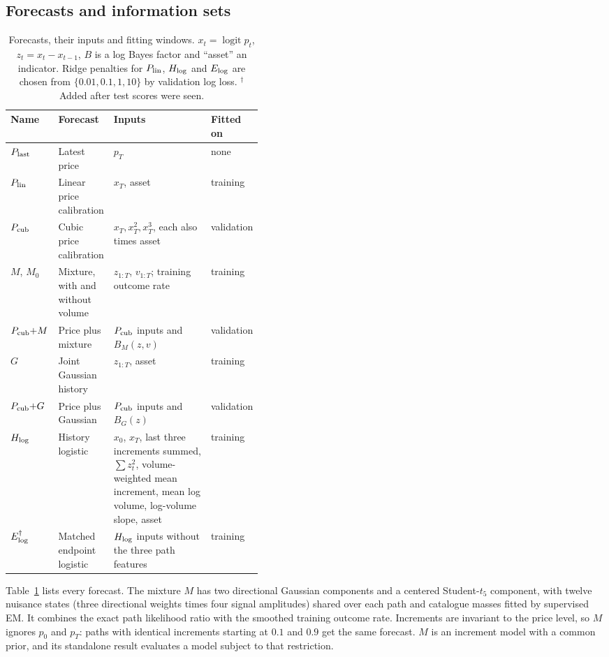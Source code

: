 \documentclass[runningheads]{llncs}
\newcommand{\logit}{\operatorname{logit}}
\begin{document}
\subsection{Forecasts and information sets}
\begin{table}[t]
\caption{Forecasts, their inputs and fitting windows. $x_t=\logit p_t$, $z_t=x_t-x_{t-1}$, $B$ is a log Bayes factor and ``asset'' an indicator. Ridge penalties for $P_{\rm lin}$, $H_{\rm log}$ and $E_{\rm log}$ are chosen from $\{0.01,0.1,1,10\}$ by validation log loss. $^\dagger$Added after test scores were seen.}
\label{tab:infosets}
\centering\scriptsize
\begin{tabular}{@{}llp{0.42\linewidth}l@{}}
\toprule
Name & Forecast & Inputs & Fitted on \\
\midrule
$P_{\rm last}$ & Latest price & $p_T$ & none \\
$P_{\rm lin}$ & Linear price calibration & $x_T$, asset & training \\
$P_{\rm cub}$ & Cubic price calibration & $x_T,x_T^2,x_T^3$, each also times asset & validation \\
$M$, $M_0$ & Mixture, with and without volume & $z_{1:T}$, $v_{1:T}$; training outcome rate & training \\
$P_{\rm cub}{+}M$ & Price plus mixture & $P_{\rm cub}$ inputs and $B_M(z,v)$ & validation \\
$G$ & Joint Gaussian history & $z_{1:T}$, asset & training \\
$P_{\rm cub}{+}G$ & Price plus Gaussian & $P_{\rm cub}$ inputs and $B_G(z)$ & validation \\
$H_{\rm log}$ & History logistic & $x_0$, $x_T$, last three increments summed, $\sum z_t^2$, volume-weighted mean increment, mean log volume, log-volume slope, asset & training \\
$E_{\rm log}^\dagger$ & Matched endpoint logistic & $H_{\rm log}$ inputs without the three path features & training \\
\bottomrule
\end{tabular}
\end{table}
Table~\ref{tab:infosets} lists every forecast. The mixture $M$ has two directional Gaussian components and a centered Student-$t_5$ component, with twelve nuisance states (three directional weights times four signal amplitudes) shared over each path and catalogue masses fitted by supervised EM. It combines the exact path likelihood ratio with the smoothed training outcome rate. Increments are invariant to the price level, so $M$ ignores $p_0$ and $p_T$: paths with identical increments starting at $0.1$ and $0.9$ get the same forecast. $M$ is an increment model with a common prior, and its standalone result evaluates a model subject to that restriction.
\end{document}
